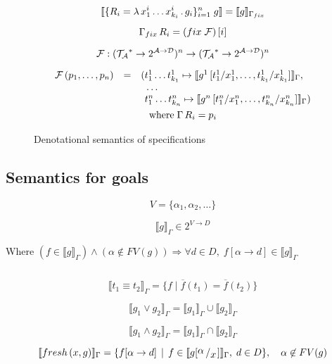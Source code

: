 \begin{figure}[t]
  \begin{gather*}
    \llbracket{\{R_i=\lambda\,x_1^i\dots x_{k_i}^i\,.\,g_i\}_{i=1}^n\;g}\rrbracket=\llbracket{g}\rrbracket_{\Gamma_{fix}}\\[2mm]
    \Gamma_{fix}\,R_i=(fix\;\mathcal{F})\,[i]\\[2mm]
    \mathcal{F} : (\mathcal{T_A}^*\to 2^{\mathcal{A}\to\mathcal{D}})^n\to (\mathcal{T_A}^*\to 2^{\mathcal{A}\to\mathcal{D}})^n\\[2mm]
    \begin{array}{rcl}
      \mathcal{F}\,(p_1,\dots,p_n)& = &(t^1_1\dots t^1_{k_1}\mapsto\llbracket{g^1\,[t^1_1/x^1_1,\dots,t^1_{k_1}/x^1_{k_1}]}\rrbracket_\Gamma,\\
                                  &  &\phantom{(}\dots\\
                                  &  &\phantom{(}t^n_1\dots t^n_{k_n}\mapsto\llbracket{g^n\,[t^n_1/x^n_1,\dots,t^n_{k_n}/x^n_{k_n}]}\rrbracket_\Gamma)
    \end{array}\\
    \mbox{where}\;\Gamma\, R_i=p_i
  \end{gather*}
  \caption{Denotational semantics of specifications}
  \label{denotational_semantics_of_relations}
\end{figure}

\subsection{Semantics for goals}

\[ V = \{ \alpha_1, \alpha_2, \dots \} \]

\[ \llbracket g \rrbracket_{\Gamma} \in 2^{V \to D} \]

Where $(f \in \llbracket g \rrbracket_{\Gamma}) \land (\alpha \not\in FV(g)) \Rightarrow \forall d \in D, \; f[\alpha \to d] \in \llbracket g \rrbracket_{\Gamma}$

\[\]

\[ \llbracket t_1 \equiv t_2 \rrbracket_{\Gamma} = \{ f \mid \overline{f}(t_1) = \overline{f}(t_2) \} \]

\[ \llbracket g_1 \lor g_2 \rrbracket_{\Gamma} = \llbracket g_1 \rrbracket_{\Gamma} \cup \llbracket g_2 \rrbracket_{\Gamma} \]

\[ \llbracket g_1 \land g_2 \rrbracket_{\Gamma} = \llbracket g_1 \rrbracket_{\Gamma} \cap \llbracket g_2 \rrbracket_{\Gamma} \]

\[ \llbracket fresh \, (x, g) \rrbracket_{\Gamma} = \{ f[\alpha \to d] \, \mid \, f \in \llbracket g[\bigslant{\alpha}{x}] \rrbracket_{\Gamma}, \; d \in D \}, \quad \alpha \not\in FV(g) \]

